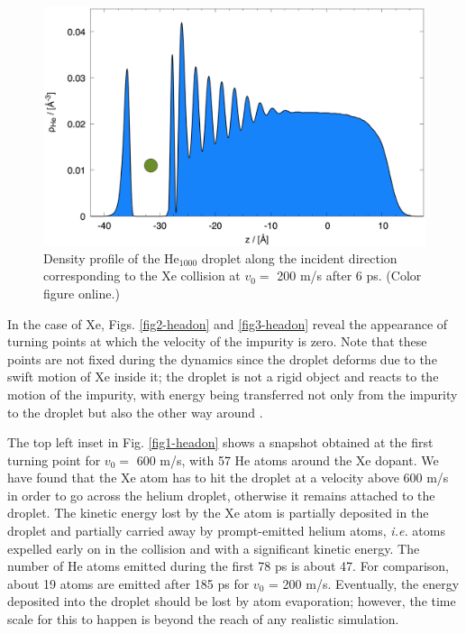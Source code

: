 \begin{figure}[!]
\centerline{\includegraphics[width=0.90\linewidth,clip]{fig4}} 
\caption{\label{fig4-headon} 
Density profile of the He$_{1000}$ droplet along the incident direction corresponding to the Xe collision at $v_0=$
 200 m/s after 6 ps. (Color figure online.)
}
\end{figure}

In the case of Xe, Figs. \ref{fig2-headon} and \ref{fig3-headon}  reveal the appearance of turning points at which the velocity of the impurity is zero.
Note that these points are not fixed during the dynamics since the droplet deforms due to the swift motion of Xe inside it; 
the droplet is not a rigid object and reacts to the motion of the impurity, with  energy being transferred not only from the impurity 
to the droplet but also the other way around \citep{Mat14}.

The top left inset in Fig. \ref{fig1-headon} shows a snapshot obtained at the first turning point for $v_0=$ 600 m/s, with 57 He atoms around the Xe dopant.
We have found that the Xe atom has to hit the droplet at a velocity above 600 m/s  in order to go across the helium droplet, otherwise it remains attached to the droplet.
The kinetic energy lost by the Xe atom is partially deposited in the droplet and partially carried away by prompt-emitted helium atoms, \textit{i.e.} atoms expelled 
early on in the collision and with a significant kinetic energy. The number of He atoms 
 emitted during the first 78 ps is about 47. For comparison, about 19 atoms are emitted after 185 ps for $v_0$ = 200 m/s. 
 Eventually, the energy deposited into the droplet should be lost by atom evaporation; however, the time scale for this to happen is 
 beyond the reach of any realistic simulation. 
 

